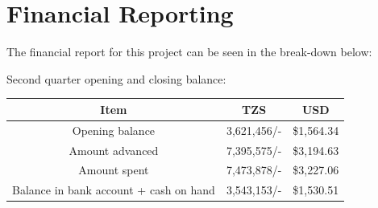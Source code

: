 \documentclass[a4paper,12pt,twoside]{article}
\begin{document}
\section{Financial Reporting}
The financial report for this project can be seen in the break-down below:


Second quarter opening and closing balance:
\begin{center}
	\begin{tabular}{|c|c|c|}
		\hline
		Item & TZS & USD \\
		\hline
		\rowcolor{Gray}
		Opening balance & 3,621,456/- & \$1,564.34 \\
	
		Amount advanced & 7,395,575/- & \$3,194.63 \\
		
		\rowcolor{Gray}
		Amount spent & 7,473,878/- & \$3,227.06 \\
		
		Balance in bank account + cash on hand & 3,543,153/- & \$1,530.51 \\
		\hline
	\end{tabular}
\end{center}
\end{document}
